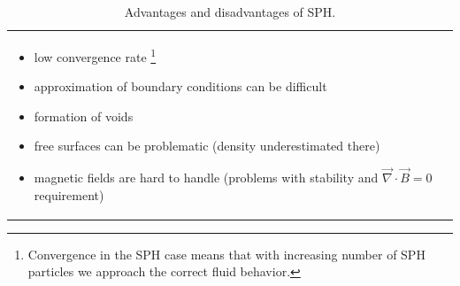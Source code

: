 \begin{table}[!htb]
\begin{tabular}{p{}|p{}}
\begin{itemize}
            \item low convergence rate \footnote{Convergence in the SPH case means that with increasing number of SPH particles we approach the correct fluid behavior.}
            \item approximation of boundary conditions can be difficult
            \item formation of voids
            \item free surfaces can be problematic (density underestimated there)
            \item magnetic fields are hard to handle (problems with stability and $\vec{\nabla} \cdot \vec{B} = 0$ requirement)
        \end{itemize} \\
    \end{tabular}
    \caption{Advantages and disadvantages of SPH.}
    \label{tab:advantages_disadvantages_sph}
\end{table}